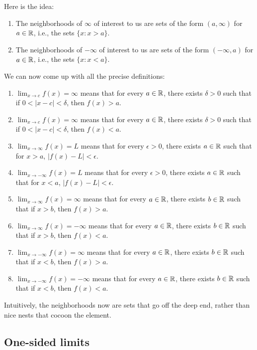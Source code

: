 \documentclass[10pt]{amsart}
\begin{document}
Here is the idea:

\begin{enumerate}
\item The neighborhoods of $\infty$ of interest to us are sets of the
  form $(a,\infty)$ for $a \in \mathbb{R}$, i.e., the sets $\{ x: x > a \}$.
\item The neighborhoods of $-\infty$ of interest to us are sets of the
  form $(-\infty,a)$ for $a \in \mathbb{R}$, i.e., the sets $\{ x: x < a \}$.
\end{enumerate}

We can now come up with all the precise definitions:

\begin{enumerate}
\item $\lim_{x \to c} f(x) = \infty$ means that for every $a \in \mathbb{R}$,
  there exists $\delta > 0$ such that if $0 < |x - c| < \delta$, then
  $f(x) > a$.
\item $\lim_{x \to c} f(x) = \infty$ means that for every $a \in \mathbb{R}$,
  there exists $\delta > 0$ such that if $0 < |x - c| < \delta$, then
  $f(x) < a$.
\item $\lim_{x \to \infty} f(x) = L$ means that for every $\epsilon >
  0$, there exists $a \in \mathbb{R}$ such that for $x > a$, $|f(x) - L| < \epsilon$.
\item $\lim_{x \to -\infty} f(x) = L$ means that for every $\epsilon >
  0$, there exists $a \in \mathbb{R}$ such that for $x < a$, $|f(x) - L| <
  \epsilon$.
\item $\lim_{x \to \infty} f(x) = \infty$ means that for every $a \in
  \mathbb{R}$, there exists $b \in \mathbb{R}$ such that if $x > b$, then $f(x) > a$.
\item $\lim_{x \to \infty} f(x) = -\infty$ means that for every $a \in
  \mathbb{R}$, there exists $b \in \mathbb{R}$ such that if $x > b$, then $f(x) < a$.
\item $\lim_{x \to -\infty} f(x) = \infty$ means that for every $a \in
  \mathbb{R}$, there exists $b \in \mathbb{R}$ such that if $x < b$, then $f(x) > a$.
\item $\lim_{x \to -\infty} f(x) = -\infty$ means that for every $a
  \in \mathbb{R}$, there exists $b \in \mathbb{R}$ such that if $x < b$, then $f(x) <
  a$.
\end{enumerate}

Intuitively, the neighborhoods now are sets that go off the deep end,
rather than nice nests that cocoon the element.

\subsection{One-sided limits}
\end{document}
